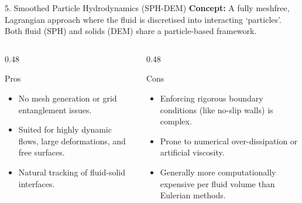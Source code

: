 \begin{frame}{5. Smoothed Particle Hydrodynamics (SPH-DEM)}
    \textbf{Concept:} A fully meshfree, Lagrangian approach where the fluid is discretised into interacting \lq particles\rq . Both fluid (SPH) and solids (DEM) share a particle-based framework.
    \vspace{0.3cm}
    
    \begin{columns}[T]
        \begin{column}{0.48\textwidth}
            \begin{block}{Pros}
                \begin{itemize}
                    \item No mesh generation or grid entanglement issues.
                    \item Suited for highly dynamic flows, large deformations, and free surfaces.
                    \item Natural tracking of fluid-solid interfaces.
                \end{itemize}
            \end{block}
        \end{column}
        
        \begin{column}{0.48\textwidth}
            \begin{alertblock}{Cons}
                \begin{itemize}
                    \item Enforcing rigorous boundary conditions (like no-slip walls) is complex.
                    \item Prone to numerical over-dissipation or artificial viscosity.
                    \item Generally more computationally expensive per fluid volume than Eulerian methods.
                \end{itemize}
            \end{alertblock}
        \end{column}
    \end{columns}
\end{frame}

